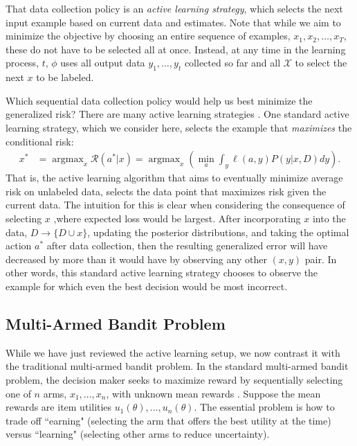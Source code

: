 \documentclass[nonblindrev]{informs3}
\newcommand{\numitems}{n}
\newcommand{\risk}{\mathcal{R}}
\begin{document}
That data collection policy is an \emph{active learning strategy}, which selects the next input example based on current data and estimates. Note that while we aim to minimize the objective by choosing an entire sequence of examples, $x_1,x_2,\ldots,x_T$, these do not have to be selected all at once. Instead, at any time in the learning process, $t$, $\phi$ uses all output data $y_1,\ldots,y_t$ collected so far and all $\mathcal{X}$ to select the next $x$ to be labeled. 

Which sequential data collection policy would help us best minimize the generalized risk? There are many active learning strategies \citep{balcan2009agnostic,balcan2010true,dasgupta2008general,fu2013survey}. One standard active learning strategy, which we consider here, selects the example that \emph{maximizes} the conditional risk:
\begin{align}
x^{*}  &= \mathop{\text{arg}\max}_x \risk(a^{*}|x) 
= \mathop{\text{arg}\max}_{x} \left( \min_{a} \int_y \ell(a,y) P(y|x,D) dy \right).
\end{align}
That is, the active learning algorithm that aims to eventually minimize average risk on unlabeled data, selects the data point that maximizes risk given the current data.  The intuition for this is clear when considering the consequence of selecting $x$ ,where expected loss would be largest. After incorporating $x$ into the data, $D \to \{D \cup x \}$, updating the posterior distributions, and taking the optimal action $a^{*}$ after data collection, then the resulting generalized error will have decreased by more than it would have by observing any other $(x,y)$ pair. In other words, this standard active learning strategy chooses to observe the example for which even the best decision would be most incorrect. 


\subsection{Multi-Armed Bandit Problem}

While we have just reviewed the active learning setup, we now contrast it with the traditional multi-armed bandit problem. In the standard multi-armed bandit problem, the decision maker seeks to maximize reward by sequentially selecting one of $\numitems$ arms, $x_1,\ldots,x_\numitems$, with unknown mean rewards \citep{GittinsEtAl2011,Robbins1952,thompson1933likelihood}. Suppose the mean rewards are item utilities $u_1(\theta), \ldots, u_\numitems(\theta)$. The essential problem is how to trade off ``earning" (selecting the arm that offers the best utility at the time) versus ``learning" (selecting other arms to reduce uncertainty). 
\end{document}
